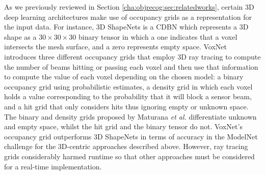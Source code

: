As we previously reviewed in Section \ref{cha:objrecog:sec:relatedworks}, certain 3D deep learning architectures make use of occupancy grids as a representation for the input data. For instance, 3D ShapeNets \cite{Wu2015} is a \ac{CDBN} which represents a 3D shape as a $30 \times 30 \times 30$ binary tensor in which a one indicates that a voxel intersects the mesh surface, and a zero represents empty space. VoxNet \cite{Maturana2015} introduces three different occupancy grids that employ 3D ray tracing to compute the number of beams hitting or passing each voxel and then use that information to compute the value of each voxel depending on the chosen model: a binary occupancy grid using probabilistic estimates, a density grid in which each voxel holds a value corresponding to the probability that it will block a sensor beam, and a hit grid that only considers hits thus ignoring empty or unknown space. The binary and density grids proposed by Maturana \emph{et al.} \cite{Maturana2015} differentiate unknown and empty space, whilst the hit grid and the binary tensor do not. VoxNet's occupancy grid outperforms 3D ShapeNets in terms of accuracy in the ModelNet challenge for the 3D-centric approaches described above. However, ray tracing grids considerably harmed runtime so that other approaches must be considered for a real-time implementation.

